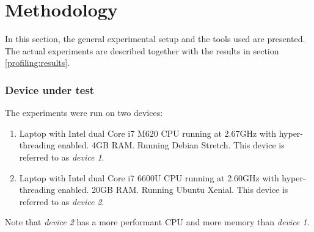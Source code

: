 \section{\label{profiling:setup}Methodology}
In this section, the general experimental setup and the tools used are presented. The actual experiments are described together with the results in section \ref{profiling:results}. 
\subsubsection{Device under test}
The experiments were run on two devices:
\begin{enumerate}
	\item Laptop with Intel dual Core i7 M620 CPU running at 2.67GHz with hyper-threading enabled. 4GB RAM. Running Debian Stretch. \newline This device is referred to as \textit{device 1}.
	\item Laptop with Intel dual Core i7 6600U CPU running at 2.60GHz with hyper-threading enabled. 20GB RAM. Running Ubuntu Xenial. \newline This device is referred to as \textit{device 2}.
\end{enumerate}
Note that \textit{device 2} has a more performant CPU and more memory than \textit{device 1}. 








